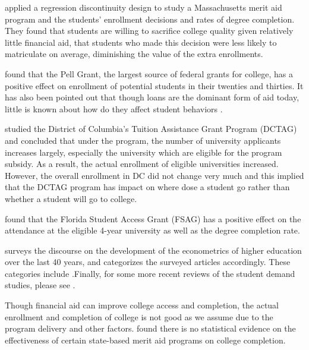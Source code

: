 \documentclass[12pt,english]{report}
\begin{document}
\citet{Cohodes2014} applied a regression discontinuity design to study a Massachusetts merit aid 
program and the students' enrollment decisions and rates of degree completion.  They found that 
students are willing to sacrifice college quality given relatively little financial aid,  that 
students who made this decision were less likely to matriculate on average, diminishing the value 
of the extra enrollments.

\citet{Turner2002} found that the Pell Grant, the largest source of federal grants for college, 
has a positive effect on enrollment of potential students in their twenties and thirties.  It has 
also been pointed out that though loans are the dominant form of aid today, little is known about how do
they affect student behaviors \citep{Dynarski2013}. 

\citet{Abraham2006} studied the District of Columbia's Tuition Assistance Grant Program (DCTAG) and concluded that under the program, the number of university applicants increases largely,
especially the university which are eligible for the program subsidy. As a result, the actual
enrollment of eligible universities increased. However, the overall enrollment in DC did not
change very much and this implied that the DCTAG program has impact on where dose a student go
rather than whether a student will go to college.

\citet{Castleman2016} found that the Florida Student Access Grant (FSAG) has a positive effect 
on the attendance at the eligible 4-year university as well as the degree completion rate.


\citet{Ehrenberg2004} surveys the discourse on the development of the econometrics of higher 
education over the last 40 years, and categorizes the surveyed articles accordingly. These 
categories include .Finally, for some more recent reviews of the student demand 
studies, please see \citep{Dynarski2002, Dynarski2003, Dynarski2000,  Dynarski2013}.

Though financial aid can improve college access and completion, the actual enrollment and
completion of college is not good as we assume due to the program delivery and other factors.
\citet{Winters2015}  found there is no statistical evidence on the effectiveness of certain state-based merit aid 
programs on college completion.
\end{document}
